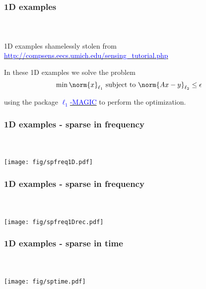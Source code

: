 \appendix



\begin{frame}[t]
\frametitle{1D examples}
\framesubtitle{~~}  %

1D examples shamelessly stolen from
\href{http://compsens.eecs.umich.edu/sensing_tutorial.php}{\textcolor{blue}{http://compsens.eecs.umich.edu/sensing\_tutorial.php}}

In these 1D examples we solve the problem
\begin{align*}
	\min \norm{x}_{\ell_1} \text{ subject to } \norm{Ax - y}_{\ell_2} \leq \epsilon
\end{align*}

using the package \href{http://users.ece.gatech.edu/~justin/l1magic/}{\textcolor{blue}{$\ell_1$-MAGIC}} to perform the optimization.

\end{frame}


\begin{frame}[t]
\frametitle{1D examples - sparse in frequency}
\framesubtitle{~~}  %

\centering
\texttt{[image: fig/spfreq1D.pdf]}

\end{frame}


\begin{frame}[t]
\frametitle{1D examples - sparse in frequency}
\framesubtitle{~~}  %

\centering
\texttt{[image: fig/spfreq1Drec.pdf]}

\end{frame}


\begin{frame}[t]
\frametitle{1D examples - sparse in time}
\framesubtitle{~~}  %

\centering
\texttt{[image: fig/sptime.pdf]}

\end{frame}


